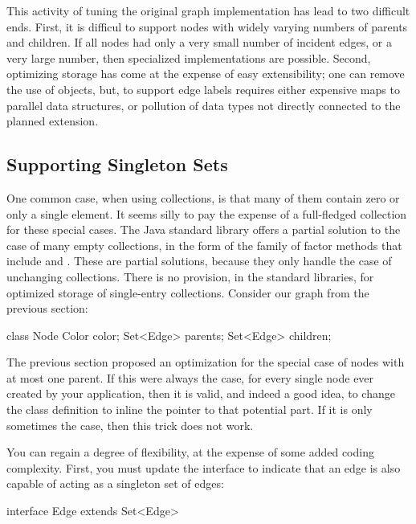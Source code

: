 This activity of tuning the original graph implementation has lead to two
difficult ends. First, it is difficul to support nodes with widely
varying numbers of parents and children. If all nodes had only a very small number of incident
edges, or a very large number, then specialized implementations are possible.
Second, optimizing storage has come at the expense of easy extensibility; one
can remove the use of  objects, but, to support edge labels 
requires either expensive maps to parallel data structures, or 
pollution of data types not directly connected to the planned extension.

\subsection{Supporting Singleton Sets}


One common case, when using collections, is that many of them contain zero or
only a single element. It seems silly to pay the expense of a full-fledged
collection for these special cases. The Java standard library offers a
partial solution to the case of many empty collections, in the form of the family
of factor methods that include  and
.
These are partial solutions, because they only handle the case of unchanging
collections. There is no provision, in the standard libraries, for optimized
storage of single-entry collections. Consider our graph from the previous
section:
\begin{shortlisting}
class Node {
	Color color;
	Set<Edge> parents;
	Set<Edge> children;
}
\end{shortlisting}
The previous section proposed an optimization for the special case of nodes with
at most one parent. If this were always the case, for every single node ever
created by your application, then it is valid, and indeed a good idea,
to change the  class definition to inline the pointer to that
potential part. If it is only sometimes the case, then this trick does not work.

You can regain a degree of flexibility, at the expense of some added coding
complexity. First, you must update the  interface to indicate that an
edge is also capable of acting as a singleton set of edges:
\begin{shortlisting}
interface Edge extends Set<Edge> {
}
\end{shortlisting}

